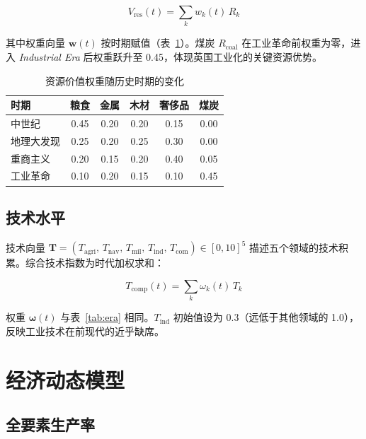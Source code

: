 \documentclass[12pt, a4paper]{article}
\begin{document}
\begin{equation}
V_{\text{res}}(t) = \sum_{k} w_k(t)\, R_k
\label{eq:res_value}
\end{equation}

其中权重向量 $\mathbf{w}(t)$ 按时期赋值（表~\ref{tab:res_weight}）。煤炭 $R_{\text{coal}}$ 在工业革命前权重为零，进入 \textit{Industrial Era} 后权重跃升至 0.45，体现英国工业化的关键资源优势。

\begin{table}[h]
\centering
\caption{资源价值权重随历史时期的变化}
\label{tab:res_weight}
\begin{tabular}{lccccc}
\toprule
时期 & 粮食 & 金属 & 木材 & 奢侈品 & 煤炭 \\
\midrule
中世纪       & 0.45 & 0.20 & 0.20 & 0.15 & 0.00 \\
地理大发现   & 0.25 & 0.20 & 0.25 & 0.30 & 0.00 \\
重商主义     & 0.20 & 0.15 & 0.20 & 0.40 & 0.05 \\
工业革命     & 0.10 & 0.20 & 0.15 & 0.10 & 0.45 \\
\bottomrule
\end{tabular}
\end{table}

\subsection{技术水平}

技术向量 $\mathbf{T} = (T_{\text{agri}},\, T_{\text{nav}},\, T_{\text{mil}},\, T_{\text{ind}},\, T_{\text{com}}) \in [0,10]^5$ 描述五个领域的技术积累。综合技术指数为时代加权求和：

\begin{equation}
T_{\text{comp}}(t) = \sum_{k} \omega_k(t)\, T_k
\label{eq:tech_composite}
\end{equation}

权重 $\boldsymbol{\omega}(t)$ 与表~\ref{tab:era} 相同。$T_{\text{ind}}$ 初始值设为 0.3（远低于其他领域的 1.0），反映工业技术在前现代的近乎缺席。

\section{经济动态模型}

\subsection{全要素生产率}
\end{document}
